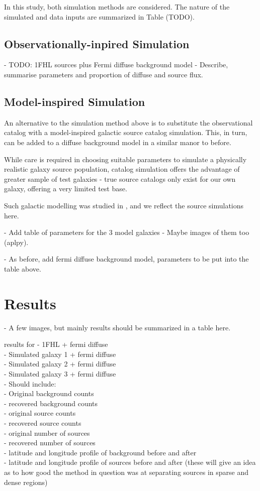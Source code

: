\documentclass{PoS}
\begin{document}
In this study, both simulation methods are considered. The nature of the simulated and data inputs are summarized in Table (TODO).


\subsection{Observationally-inpired Simulation}
- TODO: 1FHL sources plus Fermi diffuse background model
- Describe, summarise parameters and proportion of diffuse and source flux.

\subsection{Model-inspired Simulation}

An alternative to the simulation method above is to substitute the observational catalog with a model-inspired galactic source catalog simulation. This, in turn, can be added to a diffuse background model in a similar manor to before.

While care is required in choosing suitable parameters to simulate a physically realistic galaxy source population, catalog simulation offers the advantage of greater sample of test galaxies - true source catalogs only exist for our own galaxy, offering a very limited test base.

Such galactic modelling was studied in \cite{Strong}, and we reflect the source simulations here.

- Add table of parameters for the 3 model galaxies
- Maybe images of them too (aplpy).

- As before, add fermi diffuse background model, parameters to be put into the table above.


\section{Results}
- A few images, but mainly results should be summarized in a table here.

results for
- 1FHL + fermi diffuse\\
- Simulated galaxy 1 + fermi diffuse\\
- Simulated galaxy 2 + fermi diffuse\\
- Simulated galaxy 3 + fermi diffuse\\

- Should include:\\
    - Original background counts\\
    - recovered background counts\\
    - original source counts\\
    - recovered source counts\\
    - original number of sources\\
    - recovered number of sources\\
    - latitude and longitude profile of background before and after\\
    - latitude and longitude profile of sources before and after
        (these will give an idea as to how good the method in question was at separating sources in sparse and dense regions)
    
\end{document}
